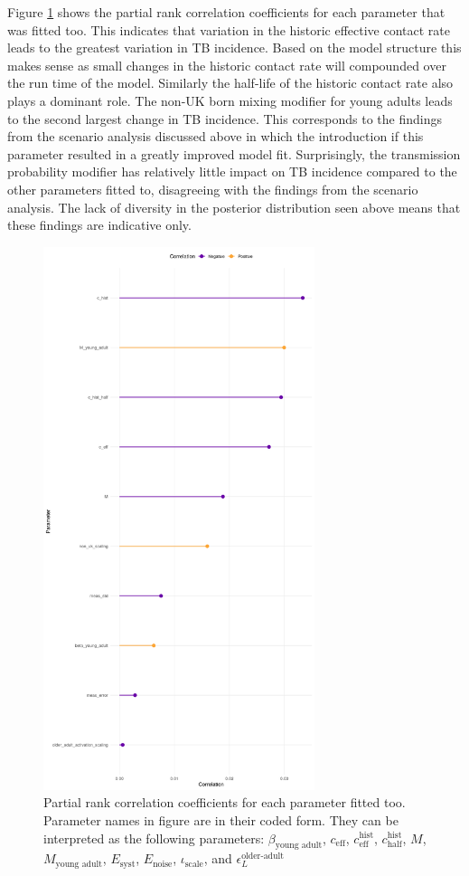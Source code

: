 \documentclass[11pt,twoside]{bristolthesis}
\begin{document}
  Figure \ref{fig:09-fig-sens} shows the partial rank correlation coefficients for each parameter that was fitted too. This indicates that variation in the historic effective contact rate leads to the greatest variation in TB incidence. Based on the model structure this makes sense as small changes in the historic contact rate will compounded over the run time of the model. Similarly the half-life of the historic contact rate also plays a dominant role. The non-UK born mixing modifier for young adults leads to the second largest change in TB incidence. This corresponds to the findings from the scenario analysis discussed above in which the introduction if this parameter resulted in a greatly improved model fit. Surprisingly, the transmission probability modifier has relatively little impact on TB incidence compared to the other parameters fitted to, disagreeing with the findings from the scenario analysis. The lack of diversity in the posterior distribution seen above means that these findings are indicative only.
  \begin{figure}
  
  {\centering \includegraphics[width=300px]{chapters/model-fitting/plots/incidence-sensitivity-1} 
  
  }
  
  \caption[Partial rank correlation coefficients for each parameter fitted too.]{Partial rank correlation coefficients for each parameter fitted too. Parameter names in figure are in their coded form. They can be interpreted as the following parameters:  $\beta_{\text{young adult}}$, $c_{\text{eff}}$, $c^{\text{hist}}_{\text{eff}}$, $c^{\text{hist}}_{\text{half}}$, $M$, $M_{\text{young adult}}$, $E_{\text{syst}}$, $E_{\text{noise}}$, $\iota_{\text{scale}}$, and $\epsilon^{\text{older-adult}}_L$}\label{fig:09-fig-sens}
  \end{figure}
\end{document}
